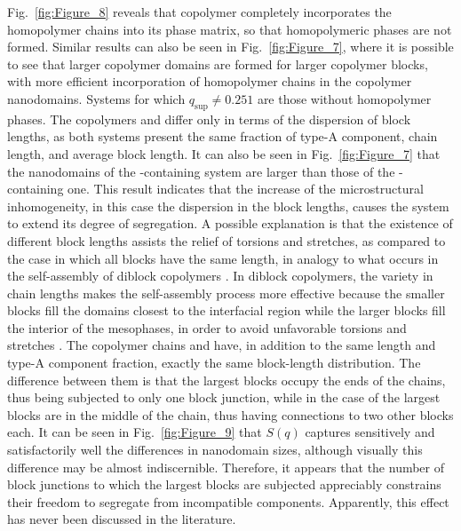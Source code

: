 \documentclass[
journal=mamobx,
manuscript=article,
]{achemso}
\begin{document}
Fig.~\ref{fig:Figure_8} reveals that copolymer  completely incorporates the homopolymer chains into its phase matrix, so that homopolymeric phases are not formed.
Similar results can also be seen in Fig.~\ref{fig:Figure_7}, where it is possible to see that larger copolymer domains are formed for larger copolymer blocks, with more efficient incorporation of homopolymer chains in the copolymer nanodomains.
Systems for which $q_\mathrm{sup} \neq 0.251$ are those without homopolymer phases.
The copolymers  and  differ only in terms of the dispersion of block lengths, as both systems present the same fraction of type-A component, chain length, and average block length.
It can also be seen in Fig.~\ref{fig:Figure_7} that the nanodomains of the -containing system are larger than those of the -containing one.
This result indicates that the increase of the microstructural inhomogeneity, in this case the dispersion in the block lengths, causes the system to extend its degree of segregation.
A possible explanation is that the existence of different block lengths assists the relief of torsions and stretches, as compared to the case in which all blocks have the same length, in analogy to what occurs in the self-assembly of diblock copolymers \cite{Matsen_2006, Lemos_2020}.
In diblock copolymers, the variety in chain lengths makes the self-assembly process more effective because the smaller blocks fill the domains closest to the interfacial region while the larger blocks fill the interior of the mesophases, in order to avoid unfavorable torsions and stretches \cite{Matsen_2006, Lemos_2020}.
The copolymer chains  and  have, in addition to the same length and type-A component fraction, exactly the same block-length distribution.
The difference between them is that the largest blocks occupy the ends of the  chains, thus being subjected to only one block junction, while in the case of  the largest blocks are in the middle of the chain, thus having connections to two other blocks each.
It can be seen in Fig.~\ref{fig:Figure_9} that $S(q)$ captures sensitively and satisfactorily well the differences in nanodomain sizes, although visually this difference may be almost indiscernible.
Therefore, it appears that the number of block junctions to which the largest blocks are subjected appreciably constrains their freedom to segregate from incompatible components. Apparently, this effect has never been discussed in the literature.
\end{document}
